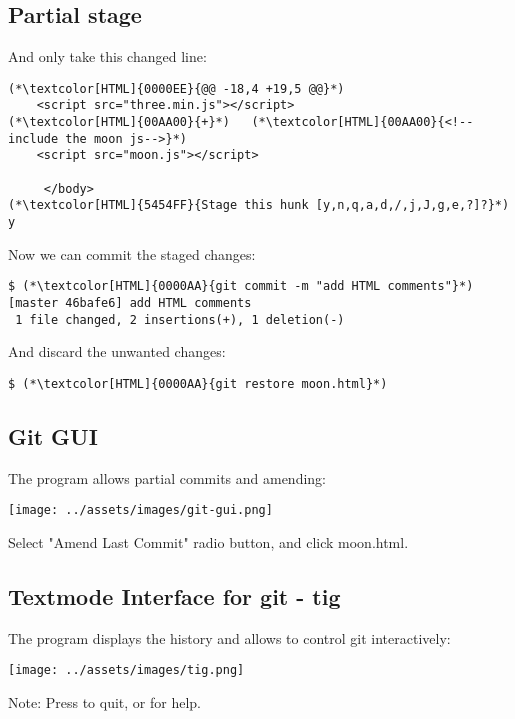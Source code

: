 \subsection{Partial stage}
\begin{frame}[fragile]
  \subslidetitle
  And only take this changed line:
  \begin{lstlisting}
(*\textcolor[HTML]{0000EE}{@@ -18,4 +19,5 @@}*)
    <script src="three.min.js"></script>
(*\textcolor[HTML]{00AA00}{+}*)   (*\textcolor[HTML]{00AA00}{<!--include the moon js-->}*)
    <script src="moon.js"></script>

     </body>
(*\textcolor[HTML]{5454FF}{Stage this hunk [y,n,q,a,d,/,j,J,g,e,?]?}*) y
\end{lstlisting}

  Now we can commit the staged changes:
  \begin{lstlisting}
$ (*\textcolor[HTML]{0000AA}{git commit -m "add HTML comments"}*)
[master 46bafe6] add HTML comments
 1 file changed, 2 insertions(+), 1 deletion(-)
\end{lstlisting}

  And discard the unwanted changes:
  \begin{lstlisting}
$ (*\textcolor[HTML]{0000AA}{git restore moon.html}*)
\end{lstlisting}
\end{frame}

\subsection{Git GUI}
\begin{frame}[fragile]
  \subslidetitle
  The program  allows partial commits and amending:
  \\
  \vspace{.5em}
  \centerline{\texttt{[image: ../assets/images/git-gui.png]}}
  \vspace{.5em}
  Select "Amend Last Commit" radio button, and click moon.html.
\end{frame}

\subsection{Textmode Interface for git - tig}
\begin{frame}[fragile]
  \subslidetitle
  The program  displays the history and allows to control git interactively:
  \\
  \vspace{1em}
  \centerline{\texttt{[image: ../assets/images/tig.png]}}

  \vspace{1em}
  Note: Press  to quit, or  for help.
\end{frame}

